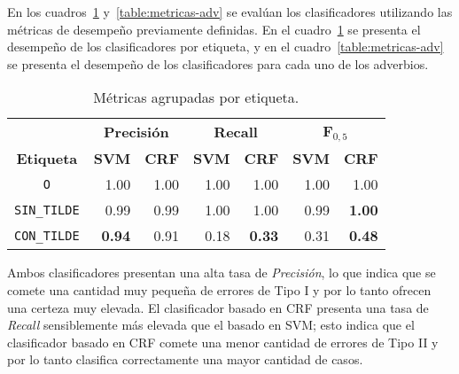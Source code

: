 \documentclass[runningheads,a4paper]{llncs}
\begin{document}
En los cuadros~\ref{table:metricas-generales} y~\ref{table:metricas-adv} se evalúan los clasificadores utilizando las métricas de desempeño previamente definidas. En el cuadro~\ref{table:metricas-generales} se presenta el desempeño de los clasificadores por etiqueta, y en el cuadro~\ref{table:metricas-adv} se presenta el desempeño de los clasificadores para cada uno de los adverbios.

\begin{table}[ht]
 	\renewcommand{\arraystretch}{1.3}
	\renewcommand{\tabcolsep}{3pt}
	\caption{Métricas agrupadas por etiqueta.}
	\label{table:metricas-generales}
	\centering
	\begin{tabular}{c r r r r r r}
		\hline
		\multicolumn{1}{c}{} 
			& \multicolumn{2}{c}{\textbf{Precisión}} 
			& \multicolumn{2}{c}{\textbf{Recall}} 
			& \multicolumn{2}{c}{\textbf{F$_{0,5}$}} \\
		\multicolumn{1}{c}{\textbf{Etiqueta}} 
			& \multicolumn{1}{r}{\textbf{SVM}} & \multicolumn{1}{r}{\textbf{CRF}}
			& \multicolumn{1}{r}{\textbf{SVM}} & \multicolumn{1}{r}{\textbf{CRF}}
			& \multicolumn{1}{r}{\textbf{SVM}} & \multicolumn{1}{r}{\textbf{CRF}} \\
		\hline\hline
		\texttt{O} & 1.00 & 1.00 & 1.00 & 1.00 & 1.00 & 1.00 \\
		\texttt{SIN\_TILDE} & 0.99 & 0.99 & 1.00 & 1.00 & 0.99 & \textbf{1.00} \\
		\texttt{CON\_TILDE} & \textbf{0.94} & 0.91 & 0.18 & \textbf{0.33} & 0.31 & \textbf{0.48} \\
		\hline
	\end{tabular}
\end{table}

Ambos clasificadores presentan una alta tasa de \emph{Precisión}, lo que indica que se comete una cantidad muy pequeña de errores de Tipo I y por lo tanto ofrecen una certeza muy elevada. El clasificador basado en CRF presenta una tasa de  \emph{Recall} sensiblemente más elevada que el basado en SVM; esto indica que el clasificador basado en CRF comete una menor cantidad de errores de Tipo II y por lo tanto clasifica correctamente una mayor cantidad de casos. 
\end{document}
